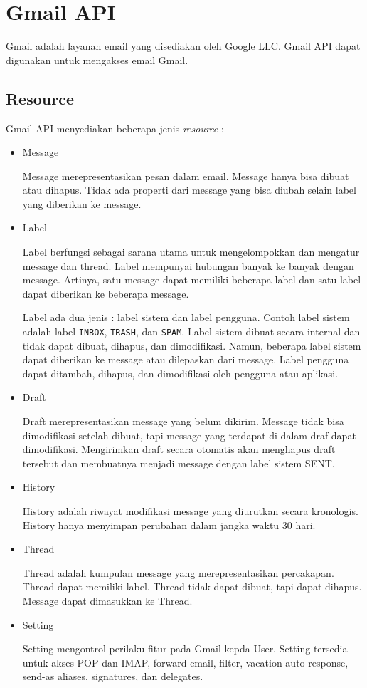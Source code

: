 \section{Gmail API ~\cite{gmail-api}}
\label{sec:gmail-api}
Gmail adalah layanan email yang disediakan oleh Google LLC. Gmail API dapat digunakan untuk mengakses email Gmail.

\subsection{Resource}
Gmail API menyediakan beberapa jenis \textit{resource} :
\begin{itemize}
\item Message

Message merepresentasikan pesan dalam email. Message hanya bisa dibuat atau dihapus. Tidak ada properti dari message yang bisa diubah selain label yang diberikan ke message.

\item Label

Label berfungsi sebagai sarana utama untuk mengelompokkan dan mengatur message dan thread. Label mempunyai hubungan banyak ke banyak dengan message. Artinya, satu message dapat memiliki beberapa label dan satu label dapat diberikan ke beberapa message.

Label ada dua jenis : label sistem dan label pengguna. Contoh label sistem adalah label \texttt{INBOX}, \texttt{TRASH}, dan \texttt{SPAM}. Label sistem dibuat secara internal dan tidak dapat dibuat, dihapus, dan dimodifikasi. Namun, beberapa label sistem dapat diberikan ke message atau dilepaskan dari message. Label pengguna dapat ditambah, dihapus, dan dimodifikasi oleh pengguna atau aplikasi.

\item Draft

Draft merepresentasikan message yang belum dikirim. Message tidak bisa dimodifikasi setelah dibuat, tapi message yang terdapat di dalam draf dapat dimodifikasi. Mengirimkan draft secara otomatis akan menghapus draft tersebut dan membuatnya menjadi message dengan label sistem SENT.

\item History

History adalah riwayat modifikasi message yang diurutkan secara kronologis. History hanya menyimpan perubahan dalam jangka waktu 30 hari.

\item Thread

Thread adalah kumpulan message yang merepresentasikan percakapan. Thread dapat memiliki label. Thread tidak dapat dibuat, tapi dapat dihapus. Message dapat dimasukkan ke Thread.

\item Setting

Setting mengontrol perilaku fitur pada Gmail kepda User. Setting tersedia untuk akses POP dan IMAP, forward email, filter, vacation auto-response, send-as aliases, signatures, dan delegates.

\end{itemize}  


